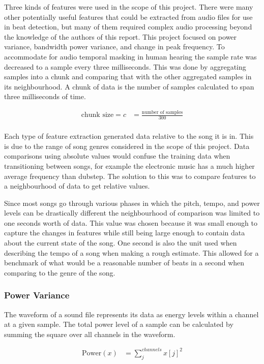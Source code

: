 Three kinds of features were used in the scope of this project. There were many other potentially useful features that could be extracted from audio files for use in beat detection, but many of them required complex audio processing beyond the knowledge of the authors of this report. This project focused on power variance, bandwidth power variance, and change in peak frequency. To accommodate for audio temporal masking in human hearing the sample rate was decreased to a sample every three milliseconds. This was done by aggregating samples into a chunk and comparing that with the other aggregated samples in its neighbourhood. A chunk of data is the number of samples calculated to span three milliseconds of time.

\begin{align*}
	\text{chunk size} = c &= \frac{\text{number of samples}}{300}\\
\end{align*}

Each type of feature extraction generated data relative to the song it is in. This is due to the range of song genres considered in the scope of this project. Data comparisons using absolute values would confuse the training data when transitioning between songs, for example the electronic music has a much higher average frequency than dubstep. The solution to this was to compare features to a neighbourhood of data to get relative values.

Since most songs go through various phases in which the pitch, tempo, and power levels can be drastically different the neighbourhood of comparison was limited to one seconds worth of data. This value was chosen because it was small enough to capture the changes in features while still being large enough to contain data about the current state of the song. One second is also the unit used when describing the tempo of a song when making a rough estimate. This allowed for a benchmark of what would be a reasonable number of beats in a second when comparing to the genre of the song.

\subsubsection{Power Variance}
The waveform of a sound file represents its data as energy levels within a channel at a given sample. The total power level of a sample can be calculated by summing the square over all channels in the waveform.

\begin{align*}
 	\text{Power}(x) &= \sum_j^{channels} x[j]^2
 \end{align*}

